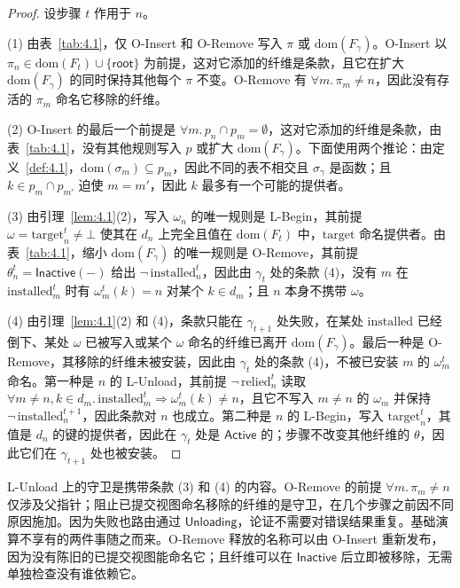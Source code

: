 \begin{proof}
设步骤 $t$ 作用于 $n$。

(1) 由表~\ref{tab:4.1}，仅 O-Insert 和 O-Remove 写入 $\pi$ 或 $\mathrm{dom}(F_\gamma)$。O-Insert 以 $\pi_n \in \mathrm{dom}(F_t) \cup \{\mathsf{root}\}$ 为前提，这对它添加的纤维是条款，且它在扩大 $\mathrm{dom}(F_\gamma)$ 的同时保持其他每个 $\pi$ 不变。O-Remove 有 $\forall m.\, \pi_m \neq n$，因此没有存活的 $\pi_m$ 命名它移除的纤维。

(2) O-Insert 的最后一个前提是 $\forall m.\, p_n \cap p_m = \emptyset$，这对它添加的纤维是条款，由表~\ref{tab:4.1}，没有其他规则写入 $p$ 或扩大 $\mathrm{dom}(F_\gamma)$。下面使用两个推论：由定义~\ref{def:4.1}，$\mathrm{dom}(\sigma_m) \subseteq p_m$，因此不同的表不相交且 $\sigma_\gamma$ 是函数；且 $k \in p_m \cap p_{m'}$ 迫使 $m = m'$，因此 $k$ 最多有一个可能的提供者。

(3) 由引理~\ref{lem:4.1}(2)，写入 $\omega_n$ 的唯一规则是 L-Begin，其前提 $\omega = \mathrm{target}^t_n \neq \bot$ 使其在 $d_n$ 上完全且值在 $\mathrm{dom}(F_t)$ 中，$\mathrm{target}$ 命名提供者。由表~\ref{tab:4.1}，缩小 $\mathrm{dom}(F_\gamma)$ 的唯一规则是 O-Remove，其前提 $\theta^t_n = \mathsf{Inactive}(-)$ 给出 $\lnot\,\mathrm{installed}^t_n$，因此由 $\gamma_t$ 处的条款 (4)，没有 $m$ 在 $\mathrm{installed}^t_m$ 时有 $\omega^t_m(k) = n$ 对某个 $k \in d_m$；且 $n$ 本身不携带 $\omega$。

(4) 由引理~\ref{lem:4.1}(2) 和 (4)，条款只能在 $\gamma_{t+1}$ 处失败，在某处 $\mathrm{installed}$ 已经倒下、某处 $\omega$ 已被写入或某个 $\omega$ 命名的纤维已离开 $\mathrm{dom}(F_\gamma)$。最后一种是 O-Remove，其移除的纤维未被安装，因此由 $\gamma_t$ 处的条款 (4)，不被已安装 $m$ 的 $\omega^t_m$ 命名。第一种是 $n$ 的 L-Unload，其前提 $\lnot\,\mathrm{relied}^t_n$ 读取 $\forall m \neq n, k \in d_m.\, \mathrm{installed}^t_m \Rightarrow \omega^t_m(k) \neq n$，且它不写入 $m \neq n$ 的 $\omega_m$ 并保持 $\lnot\,\mathrm{installed}^{t+1}_n$，因此条款对 $n$ 也成立。第二种是 $n$ 的 L-Begin，写入 $\mathrm{target}^t_n$，其值是 $d_n$ 的键的提供者，因此在 $\gamma_t$ 处是 $\mathsf{Active}$ 的；步骤不改变其他纤维的 $\theta$，因此它们在 $\gamma_{t+1}$ 处也被安装。
\end{proof}

L-Unload 上的守卫是携带条款 (3) 和 (4) 的内容。O-Remove 的前提 $\forall m.\, \pi_m \neq n$ 仅涉及父指针；阻止已提交视图命名移除的纤维的是守卫，在几个步骤之前因不同原因施加。因为失败也路由通过 $\mathsf{Unloading}$，论证不需要对错误结果重复。基础演算不享有的两件事随之而来。O-Remove 释放的名称可以由 O-Insert 重新发布，因为没有陈旧的已提交视图能命名它；且纤维可以在 $\mathsf{Inactive}$ 后立即被移除，无需单独检查没有谁依赖它。


